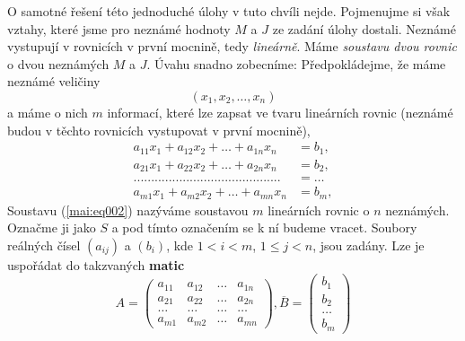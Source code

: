 {      O samotné řešení této jednoduché úlohy v tuto chvíli nejde. Pojmenujme si však vztahy, které 
      jsme pro neznámé hodnoty \(M\) a \(J\) ze zadání úlohy dostali. Neznámé vystupují v 
      rovnicích v první mocnině, tedy \emph{lineárně}. Máme \emph{soustavu dvou rovnic} o dvou 
      neznámých \(M\) a \(J\). Úvahu snadno zobecníme: Předpokládejme, že máme neznámé veličiny
      \begin{equation*}
        (x_1, x_2, \ldots, x_n)
      \end{equation*}
      a máme o nich \(m\) informací, které lze zapsat ve tvaru lineárních rovnic (neznámé budou v 
      těchto rovnicích vystupovat v první mocnině),
      \begin{align}
        a_{11}x_1 + a_{12}x_2 + \ldots + a_{1n}x_n &= b_1,     \nonumber           \\
        a_{21}x_1 + a_{22}x_2 + \ldots + a_{2n}x_n &= b_2,     \label{mai:eq002}   \\
        .......................................... &= \ldots   \nonumber           \\
        a_{m1}x_1 + a_{m2}x_2 + \ldots + a_{mn}x_n &= b_m,     \nonumber
      \end{align}
      Soustavu (\ref{mai:eq002}) nazýváme soustavou \(m\) lineárních rovnic o \(n\) neznámých. 
      Označme ji jako \(S\) a pod tímto označením se k ní budeme vracet. Soubory reálných čísel 
      \((a_{ij})\) a \((b_i)\), kde \(1 < i < m\), \(1 \leq j < n\), jsou zadány. Lze je uspořádat 
      do takzvaných \textbf{matic}
      \begin{equation}\label{mai:eq003}
        A =
          \begin{pmatrix}
            a_{11} & a_{12} & \ldots & a_{1n} \\
            a_{21} & a_{22} & \ldots & a_{2n} \\
            \ldots & \ldots & \ldots & \ldots \\
            a_{m1} & a_{m2} & \ldots & a_{mn}          
          \end{pmatrix},
          \overline{B} =
          \begin{pmatrix}
            b_1     \\
            b_2     \\
            \ldots  \\
            b_m 
          \end{pmatrix}
      \end{equation}
      
}
